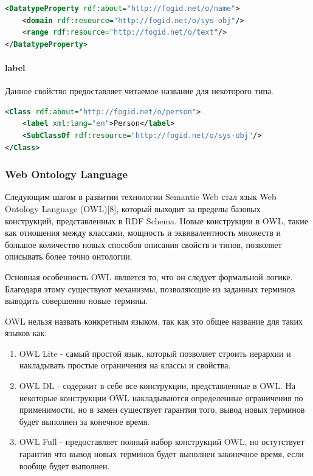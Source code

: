 \documentclass[12pt]{article}
\begin{document}
\begin{lstlisting}[language=XML]
<DatatypeProperty rdf:about="http://fogid.net/o/name">
    <domain rdf:resource="http://fogid.net/o/sys-obj"/>
    <range rdf:resource="http://fogid.net/o/text"/>
</DatatypeProperty>
\end{lstlisting}

\paragraph{label}
Данное свойство предоставляет читаемое название для некоторого типа.

\begin{lstlisting}[language=XML]
<Class rdf:about="http://fogid.net/o/person">
    <label xml:lang="en">Person</label>
    <SubClassOf rdf:resource="http://fogid.net/o/sys-obj"/>
</Class>
\end{lstlisting}

\subsubsection{Web Ontology Language}
\qquad Следующим шагом в развитии технологии Semantic Web стал язык Web Ontology Language (OWL)[8], который выходит за пределы базовых конструкций, представленных в RDF Schema. Новые конструкции в OWL, такие как отношения между классами, мощность  и эквивалентность множеств и большое количество новых способов описания свойств и типов, позволяет описывать более точно онтологии.

Основная особенность OWL является то, что он следует формальной логике. Благодаря этому существуют механизмы, позволяющие из заданных терминов выводить совершенно новые термины.

OWL нельзя назвать конкретным языком, так как это общее название для таких языков как:
\begin{enumerate}
    \item OWL Lite - самый простой язык, который позволяет строить иерархии и накладывать простые ограничения на классы и свойства.
    \item OWL DL - содержит в себе все конструкции, представленные в OWL. На некоторые конструкции OWL накладываются определенные ограничения по применимости, но в замен существует гарантия того, вывод новых терминов будет выполнен за конечное время.
    \item OWL Full - предоставляет полный набор конструкций OWL, но остутствует гарантия что вывод новых терминов будет выполнен законечное время, если вообще будет выполнен.
\end{enumerate}
\end{document}

